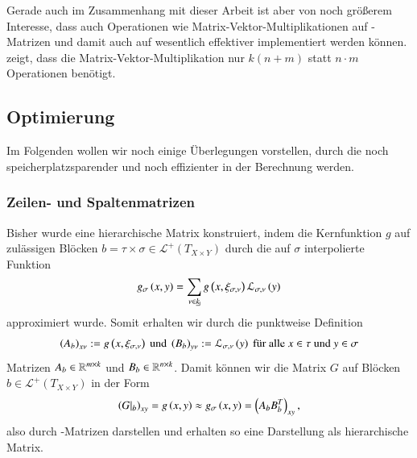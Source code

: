     Gerade auch im Zusammenhang mit dieser Arbeit ist aber von noch größerem Interesse, dass auch Operationen wie Matrix-Vektor-Multiplikationen auf \Rk-Matrizen und damit auch auf \hmat wesentlich 
    effektiver implementiert werden können. \citet{h2diss} zeigt, dass die Matrix-Vektor-Multiplikation nur $k\left(n+m\right)$ statt $n \cdot m$ Operationen benötigt.
    
    \clearpage
    
    \subsection{Optimierung}
    \label{sec:optimierung}
    Im Folgenden wollen wir noch einige Überlegungen vorstellen, durch die \hmat noch speicherplatzsparender und noch effizienter in der Berechnung werden.
    
    \subsubsection{Zeilen- und Spaltenmatrizen}
    Bisher wurde eine hierarchische Matrix konstruiert, indem die Kernfunktion $g$ auf zulässigen Blöcken $b = \tau \times \sigma \in \mathcal{L}^+\left(T_{X \times Y}\right)$ durch die auf $\sigma$ 
    interpolierte Funktion
    \begin{equation*}
      g_\sigma\left(x, y\right) = \sum_{\nu \in \haken{k}} g\left(x, \xi_\inds{\nu}\right) \lag_\inds{\nu}\left(y\right)
    \end{equation*}
    approximiert wurde. Somit erhalten wir durch die punktweise Definition
    \begin{equation*}
      \left(A_b\right)_{x\nu} := g\left(x, \xi_{\sigma, \nu}\right) \text{ und } \left(B_b\right)_{y\nu} := \mathcal{L}_{\sigma, \nu}\left(y\right) \text{ für alle } x \in \tau \text{ und } y \in \sigma
    \end{equation*}
    Matrizen $A_b \in \mathbb{R}^{m \times k}$ und $B_b \in \mathbb{R}^{n \times k}$. Damit können wir die Matrix $G$ auf Blöcken $b \in \mathcal{L}^+\left(T_{X \times Y}\right)$ in der Form 
    \begin{equation*}
      \left(G|_b\right)_{xy} = g\left(x,y\right) \approx g_\sigma\left(x,y\right) = \left(A_b B_b^T\right)_{xy},
    \end{equation*}
    also durch \Rk-Matrizen darstellen und erhalten so eine Darstellung als hierarchische Matrix. \citep{nichtlokop}
    
